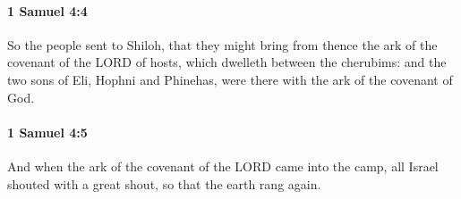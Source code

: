 		\paragraph{1 Samuel 4:4} %
			\label{1SAMUEL-4-4}

			So the people sent to Shiloh, that they might bring from thence the ark of the covenant of the LORD of hosts, which dwelleth between the cherubims: and the two sons of Eli, Hophni and Phinehas, were there with the ark of the covenant of God.


		\paragraph{1 Samuel 4:5} %
			\label{1SAMUEL-4-5}

			And when the ark of the covenant of the LORD came into the camp, all Israel shouted with a great shout, so that the earth rang again.


